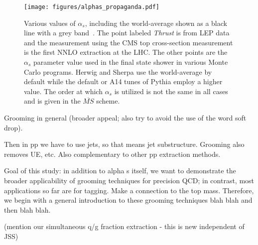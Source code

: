 \begin{figure}
\begin{center}
\texttt{[image: figures/alphas\_propaganda.pdf]}
\end{center}
\caption{Various values of $\alpha_s$, including the world-average shown as a black line with a grey band~\cite{Olive:2016xmw}.  The point labeled \textit{Thrust} is from LEP data and the measurement using the CMS top cross-section measurement is the first NNLO extraction at the LHC.  The other points are the $\alpha_s$ parameter value used in the final state shower in various Monte Carlo programs.  Herwig and Sherpa use the world-average by default while the default or A14 tunes of Pythia employ a higher value.  The order at which $\alpha_s$ is utilized is not the same in all cases and is given in the $\overline{MS}$ scheme. }
\label{fig:propaganda}
\end{figure}

Grooming in general (broader appeal; also try to avoid the use of the word soft drop).

Then in pp we have to use jets, so that means jet substructure.  Grooming also removes UE, etc.  Also complementary to other pp extraction methods.

Goal of this study: in addition to alpha s itself, we want to demonstrate the broader applicability of grooming techniques for precision QCD; in contrast, most applications so far are for tagging.  Make a connection to the top mass.  Therefore, we begin with a general introduction to these grooming techniques blah blah and then blah blah.

(mention our simultaneous q/g fraction extraction - this is new independent of JSS)


